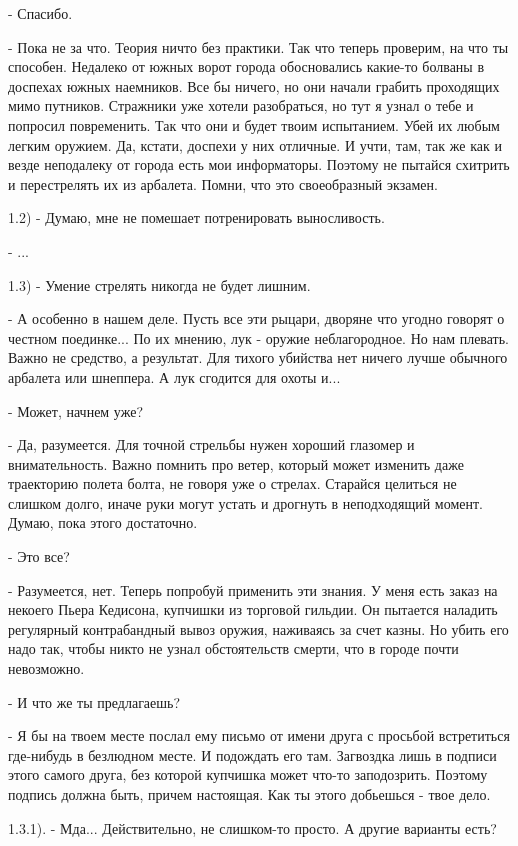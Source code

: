 \documentclass[12pt,a4paper]{book}
\begin{document}
- Спасибо.

- Пока не за что. Теория ничто без практики. Так что теперь проверим, на что ты способен. Недалеко от южных ворот города обосновались какие-то болваны в доспехах южных наемников. Все бы ничего, но они начали грабить проходящих мимо путников. Стражники уже хотели разобраться, но тут я узнал о тебе и попросил повременить. Так что они и будет твоим испытанием. Убей их любым легким оружием. Да, кстати, доспехи у них отличные. И учти, там, так же как и везде неподалеку от города есть мои информаторы. Поэтому не пытайся схитрить и перестрелять их из арбалета. Помни, что это своеобразный экзамен.

1.2) - Думаю, мне не помешает потренировать выносливость.

- ...

1.3) - Умение стрелять никогда не будет лишним.

- А особенно в нашем деле. Пусть все эти рыцари, дворяне что угодно говорят о честном поединке... По их мнению, лук - оружие неблагородное. Но нам плевать. Важно не средство, а результат. Для тихого убийства нет ничего лучше обычного арбалета или шнеппера. А лук сгодится для охоты и...

- Может, начнем уже?

- Да, разумеется. Для точной стрельбы нужен хороший глазомер и внимательность. Важно помнить про ветер, который может изменить даже траекторию полета болта, не говоря уже о стрелах. Старайся целиться не слишком долго, иначе руки могут устать и дрогнуть в неподходящий момент. Думаю, пока этого достаточно.

- Это все?

- Разумеется, нет. Теперь попробуй применить эти знания. У меня есть заказ на некоего Пьера Кедисона, купчишки из торговой гильдии. Он пытается наладить регулярный контрабандный вывоз оружия, наживаясь за счет казны. Но убить его надо так, чтобы никто не узнал обстоятельств смерти, что в городе почти невозможно.

- И что же ты предлагаешь?

- Я бы на твоем месте послал ему письмо от имени друга с просьбой встретиться где-нибудь в безлюдном месте. И подождать его там. Загвоздка лишь в подписи этого самого друга, без которой купчишка может что-то заподозрить. Поэтому подпись должна быть, причем настоящая. Как ты этого добьешься - твое дело.

1.3.1). - Мда... Действительно, не слишком-то просто. А другие варианты есть?
\end{document}
